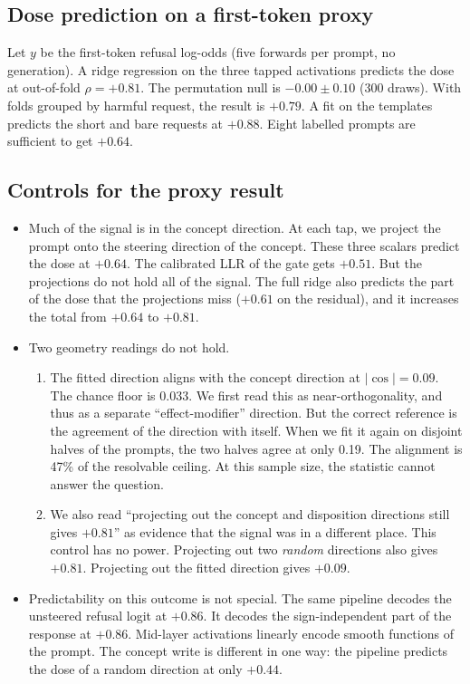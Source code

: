 \documentclass[11pt]{article}
\begin{document}
\subsection{Dose prediction on a first-token proxy}
Let $y$ be the first-token refusal log-odds (five forwards per prompt, no generation). A ridge regression on
the three tapped activations predicts the dose at out-of-fold $\rho=+0.81$. The permutation null is
$-0.00\pm0.10$ (300 draws). With folds grouped by harmful request, the result is $+0.79$. A fit on the
templates predicts the short and bare requests at $+0.88$. Eight labelled prompts are sufficient to get
$+0.64$.

\subsection{Controls for the proxy result}
\begin{itemize}[leftmargin=*]
  \item Much of the signal is in the concept direction. At each tap, we project the prompt onto
    the steering direction of the concept. These three scalars predict the dose at $+0.64$. The calibrated
    LLR of the gate gets $+0.51$. But the projections do not hold all of the signal. The full ridge also
    predicts the part of the dose that the projections miss ($+0.61$ on the residual), and it increases the
    total from $+0.64$ to $+0.81$.
  \item Two geometry readings do not hold.
    \begin{enumerate}
      \item The fitted direction aligns with the concept direction at $|\cos|=0.09$. The chance floor is
        0.033. We first read this as near-orthogonality, and thus as a separate ``effect-modifier''
        direction. But the correct reference is the agreement of the direction with itself. When we fit it
        again on disjoint halves of the prompts, the two halves agree at only 0.19. The alignment is 47\% of the resolvable ceiling. At this sample size, the statistic cannot answer the question.
      \item We also read ``projecting out the concept and disposition directions still gives $+0.81$'' as
        evidence that the signal was in a different place. This control has no power. Projecting out two
        \emph{random} directions also gives $+0.81$. Projecting out the fitted direction gives $+0.09$.
    \end{enumerate}
  \item Predictability on this outcome is not special. The same pipeline decodes the unsteered
    refusal logit at $+0.86$. It decodes the sign-independent part of the response at $+0.86$. Mid-layer
    activations linearly encode smooth functions of the prompt. The concept write is different in one way:
    the pipeline predicts the dose of a random direction at only $+0.44$.
\end{itemize}
\end{document}

